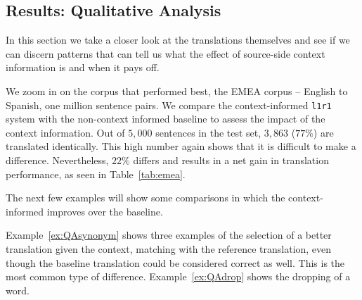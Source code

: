 \documentclass[smallextended]{svjour3}       %
\theoremstyle{break}
\begin{document}
\subsection{Results: Qualitative Analysis}

In this section we take a closer look at the translations themselves and see if
we can discern patterns that can tell us what the effect of source-side context
information is and when it pays off.

We zoom in on the corpus that performed best, the EMEA corpus -- English to
Spanish, one million sentence pairs. We compare the context-informed
\texttt{l1r1} system with the non-context informed baseline to assess the
impact of the context information. Out of $5,000$ sentences in the test set,
$3,863$ ($77\%$) are translated identically. This high number again shows that
it is difficult to make a difference. Nevertheless, $22\%$ differs and results
in a net gain in translation performance, as seen in Table~\ref{tab:emea}.

The next few examples will show some comparisons in which the context-informed
improves over the baseline. 

Example~\ref{ex:QAsynonym} shows three examples of the selection of a better
translation given the context, matching with the reference translation, even
though the baseline translation could be considered correct as well. This is
the most common type of difference. Example~\ref{ex:QAdrop} shows the dropping
of a word.
\end{document}
